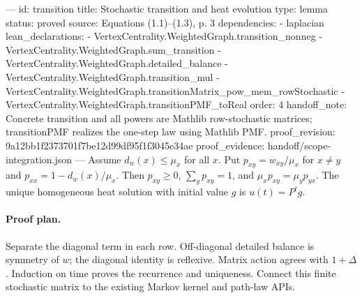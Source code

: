 ---
id: transition
title: Stochastic transition and heat evolution
type: lemma
status: proved
source: Equations (1.1)–(1.3), p. 3
dependencies:
- laplacian
lean_declarations:
- VertexCentrality.WeightedGraph.transition_nonneg
- VertexCentrality.WeightedGraph.sum_transition
- VertexCentrality.WeightedGraph.detailed_balance
- VertexCentrality.WeightedGraph.transition_mul
- VertexCentrality.WeightedGraph.transitionMatrix_pow_mem_rowStochastic
- VertexCentrality.WeightedGraph.transitionPMF_toReal
order: 4
handoff_note: Concrete transition and all powers are Mathlib row-stochastic matrices; transitionPMF realizes the one-step law using Mathlib PMF.
proof_revision: 9a12bb1f2373701f7be12d99df95f1f3045e34ae
proof_evidence: handoff/scope-integration.json
---
Assume $d_w(x)\leq\mu_x$ for all $x$. Put $p_{xy}=w_{xy}/\mu_x$ for $x\ne y$ and $p_{xx}=1-d_w(x)/\mu_x$. Then $p_{xy}\geq0$, $\sum_yp_{xy}=1$, and $\mu_xp_{xy}=\mu_yp_{yx}$. The unique homogeneous heat solution with initial value $g$ is $u(t)=P^tg$.

\paragraph{Proof plan.}
Separate the diagonal term in each row. Off-diagonal detailed balance is symmetry of $w$; the diagonal identity is reflexive. Matrix action agrees with $1+\Delta$. Induction on time proves the recurrence and uniqueness. Connect this finite stochastic matrix to the existing Markov kernel and path-law APIs.
